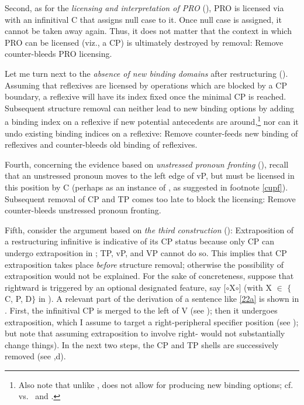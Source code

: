 \documentclass[output=paper]{langsci/langscibook}
\begin{document}
Second, as for the {\itshape licensing and interpretation of PRO} (), PRO
is licensed via  with an infinitival C that assigns null case to it. Once
null case is assigned, it cannot be taken away again. Thus, it does not matter
that the context in which PRO can be licensed (viz., a CP) is ultimately
destroyed by removal: Remove counter-bleeds PRO licensing.

Let me turn next to the {\itshape absence of new binding domains} after
restructuring ().  Assuming that reflexives are licensed by 
operations which are blocked by a CP boundary, a reflexive will have its index
fixed once the minimal CP is reached. Subsequent structure removal can neither
lead to new binding options by adding a binding index on a reflexive if new
potential antecedents are around,\footnote{Also note that unlike ,
     does not allow for  producing new binding options; cf.
\cite{Barss:86} vs.\ \cite{Frey:93} and \cite{Buering:05}.} nor can it undo
existing binding indices on a reflexive: Remove counter-feeds new binding of
reflexives and counter-bleeds old binding of reflexives.

Fourth, concerning the evidence based on {\itshape unstressed pronoun
fronting}
(), recall that  an unstressed pronoun moves to the left edge of vP,
but must be licensed in this position by C (perhaps as an instance of , as
suggested in footnote \ref{cupf}). Subsequent removal of CP and TP comes too
late to block the licensing: Remove counter-bleeds unstressed pronoun fronting.

Fifth, consider the argument based on {\itshape the third construction} ():
Extraposition of a restructuring infinitive is indicative of its CP status
because only CP can undergo extraposition in ; TP, vP, and VP cannot do
so. This implies that CP extraposition takes place {\itshape before} structure
removal; otherwise the possibility of extraposition would not be explained. For
the sake of concreteness, suppose that rightward  is triggered by an
optional designated feature, say [$\circ$X$\circ$] (with X $\in$ $\{$C, P,
D$\}$ in ). A relevant part of the derivation of a sentence like
\eqref{22a} is shown in . First, the infinitival CP is merged
to the left of V (see ); then it undergoes extraposition,
which I assume to target a right-peripheral specifier position (see
); but note that assuming extraposition to involve
right- would not substantially change things). In the next two steps,
the CP and TP shells are successively removed (see ,d).
\end{document}
